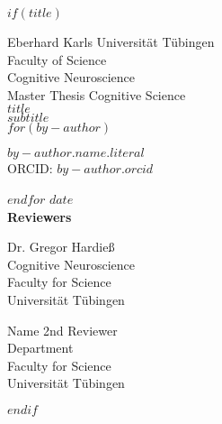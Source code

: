 
$if(title)$
{
\centering
\huge Eberhard Karls Universität Tübingen \\
\Large Faculty of Science \\
\Large Cognitive Neuroscience \\
\vspace{10ex}
\huge Master Thesis Cognitive Science\\
\vspace{3ex}
\huge\textbf{$title$}\\
\huge $subtitle$\\
\vspace{3ex}
$for(by-author)$
\begin{center}
\Large $by-author.name.literal$\\
\large ORCID: \href{https://orcid.org/$by-author.orcid$}{$by-author.orcid$}
\end{center}
$endfor$
\vspace{3ex}
\Large $date$\\
\vspace{10ex}
\Large\textbf{Reviewers}\\
\vspace{3ex}
\parbox{0.5\textwidth}{
	\begin{center}
		{\Large Dr. Gregor Hardieß}\\
		\large Cognitive Neuroscience\\
		Faculty for Science\\
		Universität Tübingen
	\end{center}}
\hfill
\parbox{0.5\textwidth}{
	\begin{center}
  		{\Large Name 2nd Reviewer}\\
  		\large Department\\
  		Faculty for Science\\
  		Universität Tübingen
  	\end{center}
 }
}
$endif$